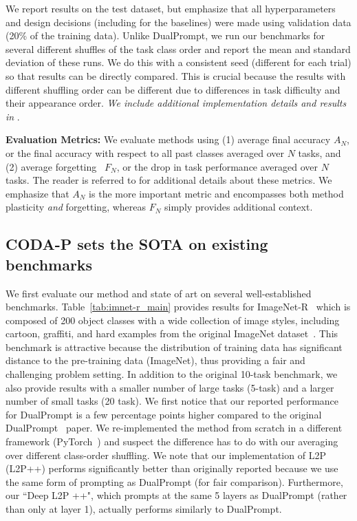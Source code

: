 We report results on the test dataset, but emphasize that all hyperparameters and design decisions (including for the baselines) were made using validation data (20\% of the training data). Unlike DualPrompt, we run our benchmarks for several different shuffles of the task class order and report the mean and standard deviation of these runs. We do this with a consistent seed (different for each trial) so that results can be directly compared. This is crucial because the results with different shuffling order can be different due to differences in task difficulty and their appearance order. \emph{We include additional implementation details and results in \SMb{}}.


\noindent
\textbf{Evaluation Metrics:} We evaluate methods using (1)
average final accuracy $A_{N}$, or the final accuracy with respect to all past classes averaged over $N$ tasks, and (2) average forgetting~\cite{chaudhry2018efficient,Lopez-Paz:2017,mai2022online} $F_{N}$, or the drop in task performance averaged over $N$ tasks. The reader is referred to \SMc{} for additional details about these metrics. We emphasize that $A_{N}$ is the more important metric and encompasses both method plasticity \emph{and} forgetting, whereas $F_{N}$ simply provides additional context.



\subsection{CODA-P sets the SOTA on existing benchmarks}
We first evaluate our method and state of art on several well-established benchmarks. Table~\ref{tab:imnet-r_main} provides results for ImageNet-R~\cite{hendrycks2021many,wang2022dualprompt} which is composed of 200 object classes with a wide collection of image styles, including cartoon, graffiti, and hard examples from the original ImageNet dataset~\cite{russakovsky2015imagenet}. This benchmark is attractive because the distribution of training data has significant distance to the pre-training data (ImageNet), thus providing a fair and challenging problem setting. In addition to the original 10-task benchmark, we also provide results with a smaller number of large tasks (5-task) and a larger number of small tasks (20 task). We first notice that our reported performance for DualPrompt is a few percentage points higher compared to the original DualPrompt~\cite{wang2022dualprompt} paper. We re-implemented the method from scratch in a different framework (PyTorch~\cite{paszke2019pytorch}) and suspect the difference has to do with our averaging over different class-order shuffling. 
We note that our implementation of L2P (L2P++) performs significantly better than originally reported because we use the same form of prompting as DualPrompt (for fair comparison). Furthermore, our ``Deep L2P ++", which prompts at the same 5 layers as DualPrompt (rather than only at layer 1), actually performs similarly to DualPrompt.

